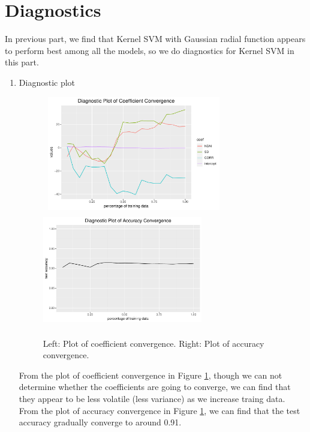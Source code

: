 \documentclass[11pt]{article}
\begin{document}
\section{Diagnostics}
In previous part, we find that Kernel SVM with Gaussian radial function appears to perform best among all the models, so we do diagnostics for Kernel SVM in this part.
\begin{enumerate}[label=(\alph*)]
\item Diagnostic plot \\
	\begin{figure}[h!]
		\includegraphics[width = 8cm,height = 5cm]{Figure/diag1}
		\includegraphics[width = 7cm,height = 5cm]{Figure/diag2}
		\caption{Left: Plot of coefficient convergence. Right: Plot of accuracy convergence.}
		\label{diag}
	\end{figure}
	From the plot of coefficient convergence in Figure \ref{diag}, though we can not determine whether the coefficients are going to converge, we can find that they appear to be less volatile (less variance) as we increase traing data. \\
	From the plot of accuracy convergence in Figure \ref{diag}, we can find that the test accuracy gradually converge to around 0.91.
	

\end{enumerate}
\end{document}
